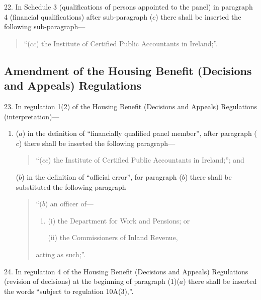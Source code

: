 \documentclass[12pt,a4paper]{article}
\begin{document}
\medskip

22.  In Schedule 3 (qualifications of persons appointed to the panel) in paragraph 4 (financial qualifications) after sub-paragraph ($c$)  there shall be inserted the following sub-paragraph—
\begin{quotation}
“($cc$) the Institute of Certified Public Accountants in Ireland;”.
\end{quotation}

\subsection[23--28. Amendment of the Housing Benefit (Decisions and Appeals) Regulations]{Amendment of the Housing Benefit (Decisions and Appeals) Regulations}

23.  In regulation 1(2) of the Housing Benefit (Decisions and Appeals) Regulations (interpretation)—
\begin{enumerate}\item[]
($a$) in the definition of “financially qualified panel member”, after paragraph ($c$)  there shall be inserted the following paragraph—
\begin{quotation}
“($cc$) the Institute of Certified Public Accountants in Ireland;”; and
\end{quotation}

($b$) in the definition of “official error”, for paragraph ($b$)  there shall be substituted the following paragraph—
\begin{quotation}
“($b$) an officer of—
\begin{enumerate}\item[]
(i) the Department for Work and Pensions; or

(ii) the Commissioners of Inland Revenue,
\end{enumerate}
acting as such;”.
\end{quotation}
\end{enumerate}

\medskip

24.  In regulation 4 of the Housing Benefit (Decisions and Appeals) Regulations (revision of decisions) at the beginning of paragraph (1)($a$)  there shall be inserted the words “subject to regulation 10A(3),”.

\medskip
\end{document}
